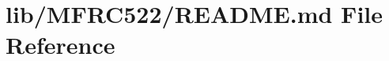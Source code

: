 \hypertarget{lib_2_m_f_r_c522_2_r_e_a_d_m_e_8md}{}\section{lib/\+M\+F\+R\+C522/\+R\+E\+A\+D\+ME.md File Reference}
\label{lib_2_m_f_r_c522_2_r_e_a_d_m_e_8md}
